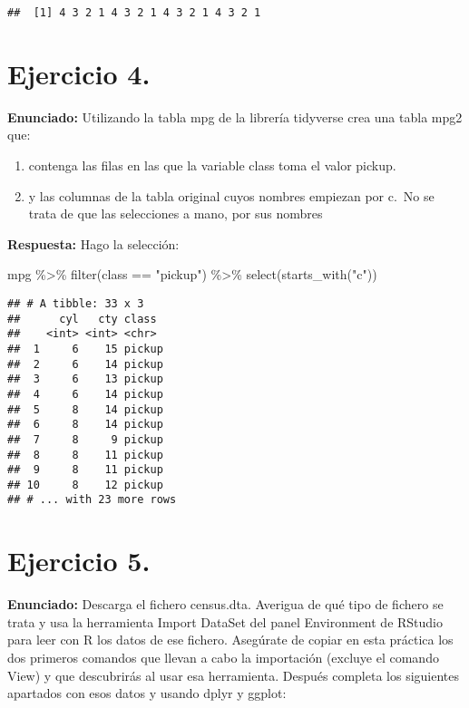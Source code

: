 \documentclass[
]{article}
\newenvironment{Shaded}{\begin{snugshade}}{\end{snugshade}}
\newcommand{\FunctionTok}[1]{\textcolor[rgb]{0.00,0.00,0.00}{#1}}
\newcommand{\NormalTok}[1]{#1}
\newcommand{\SpecialCharTok}[1]{\textcolor[rgb]{0.00,0.00,0.00}{#1}}
\newcommand{\StringTok}[1]{\textcolor[rgb]{0.31,0.60,0.02}{#1}}
\begin{document}
\begin{verbatim}
##  [1] 4 3 2 1 4 3 2 1 4 3 2 1 4 3 2 1
\end{verbatim}

\hypertarget{ejercicio-4.}{%
\section{Ejercicio 4.}\label{ejercicio-4.}}

\textbf{Enunciado:} Utilizando la tabla mpg de la librería tidyverse
crea una tabla mpg2 que:

\begin{enumerate}
\def\labelenumi{\Roman{enumi})}
\item
  contenga las filas en las que la variable class toma el valor pickup.
\item
  y las columnas de la tabla original cuyos nombres empiezan por c.~No
  se trata de que las selecciones a mano, por sus nombres
\end{enumerate}

\textbf{Respuesta:} Hago la selección:

\begin{Shaded}
\begin{Highlighting}[]
\NormalTok{mpg }\SpecialCharTok{\%\textgreater{}\%} 
  \FunctionTok{filter}\NormalTok{(class }\SpecialCharTok{==} \StringTok{"pickup"}\NormalTok{) }\SpecialCharTok{\%\textgreater{}\%} 
  \FunctionTok{select}\NormalTok{(}\FunctionTok{starts\_with}\NormalTok{(}\StringTok{"c"}\NormalTok{))  }
\end{Highlighting}
\end{Shaded}

\begin{verbatim}
## # A tibble: 33 x 3
##      cyl   cty class 
##    <int> <int> <chr> 
##  1     6    15 pickup
##  2     6    14 pickup
##  3     6    13 pickup
##  4     6    14 pickup
##  5     8    14 pickup
##  6     8    14 pickup
##  7     8     9 pickup
##  8     8    11 pickup
##  9     8    11 pickup
## 10     8    12 pickup
## # ... with 23 more rows
\end{verbatim}

\hypertarget{ejercicio-5.}{%
\section{Ejercicio 5.}\label{ejercicio-5.}}

\textbf{Enunciado:} Descarga el fichero census.dta. Averigua de qué tipo
de fichero se trata y usa la herramienta Import DataSet del panel
Environment de RStudio para leer con R los datos de ese fichero.
Asegúrate de copiar en esta práctica los dos primeros comandos que
llevan a cabo la importación (excluye el comando View) y que descubrirás
al usar esa herramienta. Después completa los siguientes apartados con
esos datos y usando dplyr y ggplot:
\end{document}
